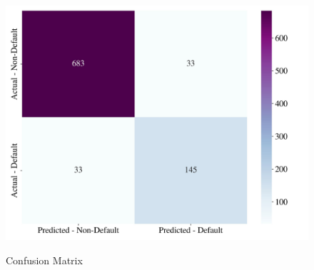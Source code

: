 \begin{figure}[H]
\centering
\caption{Confusion Matrix}\vspace{0.5em}
\label{fig:confmat}\
\includegraphics[width=130mm]{Figures/Confusion_Matrix.jpg}
\vspace{-1em}
\end{figure}

